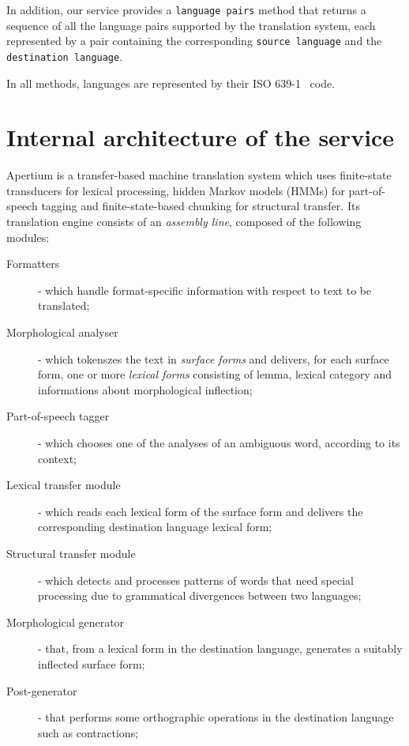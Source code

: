 \documentclass[11pt]{article}
\begin{document}
In addition, our service provides a {\tt\small language pairs} method that returns a sequence 
of all the language pairs supported by the translation system, each represented by a pair 
containing the corresponding {\tt\small source language} and the {\tt\small destination language}.


In all methods, languages are represented by their ISO 639-1~\citep{ISO:639-1} code.



\section{Internal architecture of the service}

Apertium is a transfer-based machine translation system which uses 
finite-state transducers for lexical processing, hidden Markov models (HMMs) 
for part-of-speech tagging and finite-state-based chunking for structural 
transfer. Its translation engine consists of an \emph{assembly line}, 
composed of the following modules:

\begin{description}
 \item[Formatters] - which handle format-specific information with respect to text to be translated;
 \item[Morphological analyser] - which tokenszes the text in \emph{surface forms} and delivers, 
       for each surface form, one or more \emph{lexical forms} consisting of lemma, lexical 
       category and informations about morphological inflection;
 \item[Part-of-speech tagger] - which chooses one of the analyses of an ambiguous word, according 
       to its context;
 \item[Lexical transfer module] - which reads each lexical form of the surface form and delivers  
       the corresponding destination language lexical form;
 \item[Structural transfer module] - which detects and processes patterns of words that need special 
       processing due to grammatical divergences between two languages;
 \item[Morphological generator] - that, from a lexical form in the destination language, generates 
       a suitably inflected surface form;
 \item[Post-generator] - that performs some orthographic operations in the destination language 
       such as contractions;
\end{description}
\end{document}
